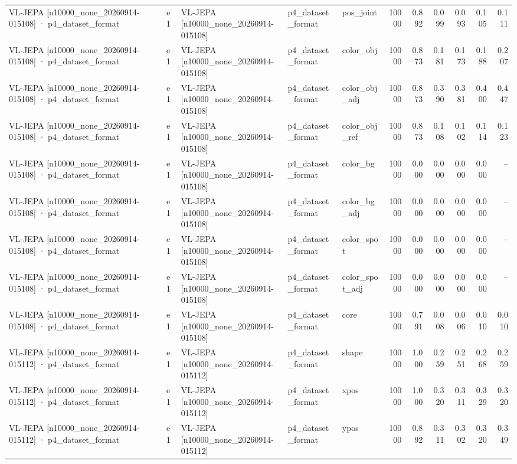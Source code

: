 \begin{tabular}{lllllrrrrrr}
VL-JEPA [n10000\_none\_20260914-015108] · p4\_dataset\_format & e1 & VL-JEPA [n10000\_none\_20260914-015108] & p4\_dataset\_format & pos\_joint & 10000 & 0.892 & 0.099 & 0.093 & 0.105 & 0.111 \\
VL-JEPA [n10000\_none\_20260914-015108] · p4\_dataset\_format & e1 & VL-JEPA [n10000\_none\_20260914-015108] & p4\_dataset\_format & color\_obj & 10000 & 0.873 & 0.181 & 0.173 & 0.188 & 0.207 \\
VL-JEPA [n10000\_none\_20260914-015108] · p4\_dataset\_format & e1 & VL-JEPA [n10000\_none\_20260914-015108] & p4\_dataset\_format & color\_obj\_adj & 10000 & 0.873 & 0.390 & 0.381 & 0.400 & 0.447 \\
VL-JEPA [n10000\_none\_20260914-015108] · p4\_dataset\_format & e1 & VL-JEPA [n10000\_none\_20260914-015108] & p4\_dataset\_format & color\_obj\_ref & 10000 & 0.873 & 0.108 & 0.102 & 0.114 & 0.123 \\
VL-JEPA [n10000\_none\_20260914-015108] · p4\_dataset\_format & e1 & VL-JEPA [n10000\_none\_20260914-015108] & p4\_dataset\_format & color\_bg & 10000 & 0.000 & 0.000 & 0.000 & 0.000 & -- \\
VL-JEPA [n10000\_none\_20260914-015108] · p4\_dataset\_format & e1 & VL-JEPA [n10000\_none\_20260914-015108] & p4\_dataset\_format & color\_bg\_adj & 10000 & 0.000 & 0.000 & 0.000 & 0.000 & -- \\
VL-JEPA [n10000\_none\_20260914-015108] · p4\_dataset\_format & e1 & VL-JEPA [n10000\_none\_20260914-015108] & p4\_dataset\_format & color\_spot & 10000 & 0.000 & 0.000 & 0.000 & 0.000 & -- \\
VL-JEPA [n10000\_none\_20260914-015108] · p4\_dataset\_format & e1 & VL-JEPA [n10000\_none\_20260914-015108] & p4\_dataset\_format & color\_spot\_adj & 10000 & 0.000 & 0.000 & 0.000 & 0.000 & -- \\
VL-JEPA [n10000\_none\_20260914-015108] · p4\_dataset\_format & e1 & VL-JEPA [n10000\_none\_20260914-015108] & p4\_dataset\_format & core & 10000 & 0.791 & 0.008 & 0.006 & 0.010 & 0.010 \\
VL-JEPA [n10000\_none\_20260914-015112] · p4\_dataset\_format & e1 & VL-JEPA [n10000\_none\_20260914-015112] & p4\_dataset\_format & shape & 10000 & 1.000 & 0.259 & 0.251 & 0.268 & 0.259 \\
VL-JEPA [n10000\_none\_20260914-015112] · p4\_dataset\_format & e1 & VL-JEPA [n10000\_none\_20260914-015112] & p4\_dataset\_format & xpos & 10000 & 1.000 & 0.320 & 0.311 & 0.329 & 0.320 \\
VL-JEPA [n10000\_none\_20260914-015112] · p4\_dataset\_format & e1 & VL-JEPA [n10000\_none\_20260914-015112] & p4\_dataset\_format & ypos & 10000 & 0.892 & 0.311 & 0.302 & 0.320 & 0.349 \\

\end{tabular}
